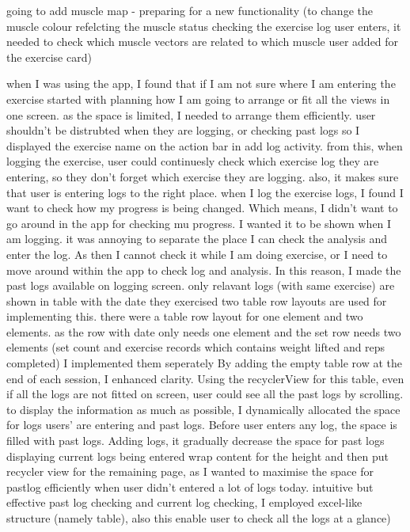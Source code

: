     going to add muscle map - preparing for a new functionality (to change the muscle colour refelcting the muscle status checking the exercise log user enters, it needed to check which muscle vectors are related to which muscle user added for the exercise card)

    
when I was using the app, I found that if I am not sure where I am entering the exercise
started with planning how I am going to arrange or fit all the views in one screen. 
as the space is limited, I needed to arrange them efficiently. 
user shouldn't be distrubted when they are logging, or checking past logs
so I displayed the exercise name on the action bar in add log activity. 
from this, when logging the exercise, user could continuesly check which exercise log they are entering, so they don't forget which exercise they are logging. 
also, it makes sure that user is entering logs to the right place. 
when I log the exercise logs, I found I want to check how my progress is being changed.
Which means, I didn't want to go around in the app for checking mu progress. 
I wanted it to be shown when I am logging. 
it was annoying to separate the place I can check the analysis and enter the log.
As then I cannot check it while I am doing exercise, or I need to move around within the app to check log and analysis. 
In this reason, I made the past logs available on logging screen.
only relavant logs (with same exercise) are shown in table with the date they exercised
two table row layouts are used for implementing this.
there were a table row layout for one element and two elements.
as the row with date only needs one element 
and the set row needs two elements (set count and exercise records which contains weight lifted and reps completed)
I implemented them seperately
By adding the empty table row at the end of each session, I enhanced clarity.
Using the recyclerView for this table, even if all the logs are not fitted on screen, user could see all the past logs by scrolling.
to display the information as much as possible, I dynamically allocated the space for logs users' are entering and past logs.
Before user enters any log, the space is filled with past logs.
Adding logs, it gradually decrease the space for past logs displaying current logs being entered
wrap content for the height and then put recycler view for the remaining page, 
as I wanted to maximise the space for pastlog efficiently when user didn't entered a lot of logs today. 
intuitive but effective past log checking and current log checking, I employed excel-like structure (namely table), also this enable user to check all the logs at a glance)
